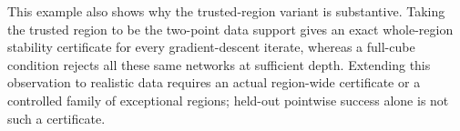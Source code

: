 This example also shows why the trusted-region variant is substantive.
Taking the trusted region to be the two-point data support gives an exact
whole-region stability certificate for every gradient-descent iterate,
whereas a full-cube condition rejects all these same networks at sufficient
depth. Extending this observation to realistic data requires an actual
region-wide certificate or a controlled family of exceptional regions;
held-out pointwise success alone is not such a certificate.
